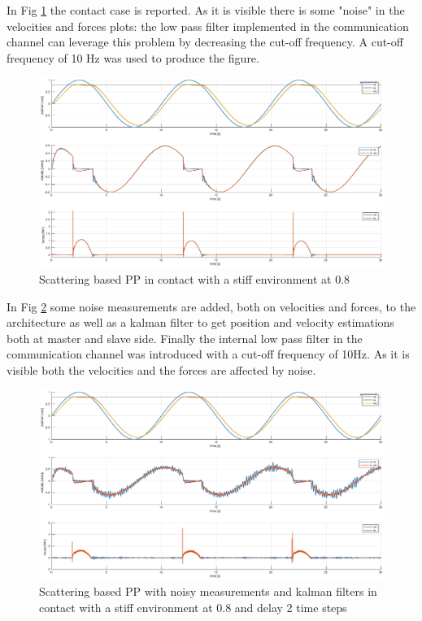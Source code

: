 \documentclass[a4paper,12pt]{article}
\begin{document}
\newpage
In Fig \ref{fig:scat_pp_contact} the contact case is reported. As it is visible there is some "noise" in the velocities and forces plots: the low pass filter implemented in the communication channel can leverage this problem by decreasing the cut-off frequency. A cut-off frequency of 10 Hz was used to produce the figure.

\begin{figure}[H]
    \begin{center}
        \hspace*{-4.5cm}
        \includegraphics[scale=0.5]{images/scat_pp_contact.eps}
    \end{center}
    \caption{Scattering based PP in contact with a stiff environment at 0.8}
    \label{fig:scat_pp_contact}
\end{figure}

In Fig \ref{fig:scat_pp_contact_kalman} some noise measurements are added, both on velocities and forces, to the architecture as well as a kalman filter to get position and velocity estimations both at master and slave side. Finally the internal low pass filter in the communication channel was introduced with a cut-off frequency of 10Hz. As it is visible both the velocities and the forces are affected by noise.

\begin{figure}[H]
    \begin{center}
        \hspace*{-4.5cm}
        \includegraphics[scale=0.5]{images/scat_pp_contact_kalman.eps}
    \end{center}
    \caption{Scattering based PP with noisy measurements and kalman filters in contact with a stiff environment at 0.8 and delay 2 time steps}
    \label{fig:scat_pp_contact_kalman}
\end{figure}
\end{document}
